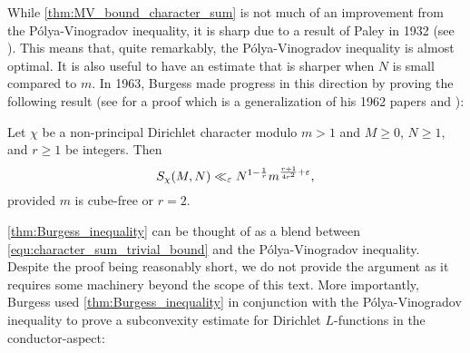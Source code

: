     While \cref{thm:MV_bound_character_sum} is not much of an improvement from the P\'olya-Vinogradov inequality, it is sharp due to a result of Paley in 1932 (see \cite{paley1932theorem}). This means that, quite remarkably, the P\'olya-Vinogradov inequality is almost optimal. It is also useful to have an estimate that is sharper when $N$ is small compared to $m$. In 1963, Burgess made progress in this direction by proving the following result (see \cite{burgess1963character} for a proof which is a generalization of his 1962 papers \cite{burgess1962characterL-series} and \cite{burgess1962characterprimitive}):

    \begin{theorem}\label{thm:Burgess_inequality}
      Let $\chi$ be a non-principal Dirichlet character modulo $m > 1$ and $M \ge 0$, $N \ge 1$, and $r \ge 1$ be integers. Then
      \[
        S_{\chi}(M,N) \ll_{\varepsilon} N^{1-\frac{1}{r}}m^{\frac{r+1}{4r^{2}}+\varepsilon},
      \]
      provided $m$ is cube-free or $r = 2$.
    \end{theorem}

    \cref{thm:Burgess_inequality} can be thought of as a blend between \cref{equ:character_sum_trivial_bound} and the P\'olya-Vinogradov inequality. Despite the proof being reasonably short, we do not provide the argument as it requires some machinery beyond the scope of this text. More importantly, Burgess used \cref{thm:Burgess_inequality} in conjunction with the P\'olya-Vinogradov inequality to prove a subconvexity estimate for Dirichlet $L$-functions in the conductor-aspect:

